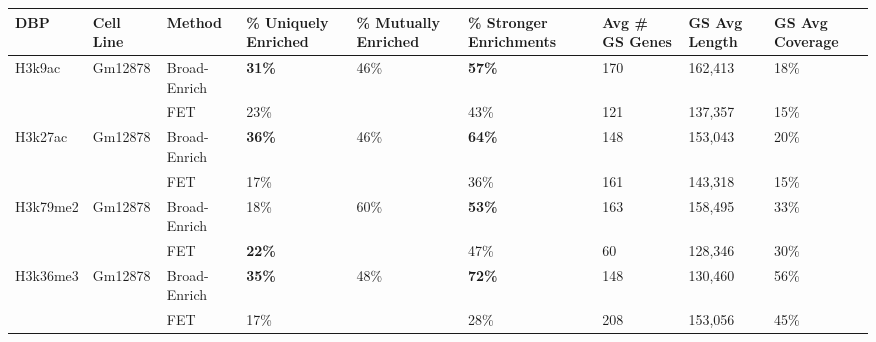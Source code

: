\newpage

\begin{sidewaystable}[!ht]
\tiny
\centering
\begin{tabular}{lll|p{1.5cm}p{1.5cm}p{1.5cm}p{1.5cm}p{1.5cm}p{1.5cm}}
\textbf{DBP} & \textbf{Cell Line} & \textbf{Method} & \textbf{\% Uniquely Enriched} & \textbf{\% Mutually Enriched} & \textbf{\% Stronger Enrichments} & \textbf{Avg \# GS Genes} & \textbf{GS Avg Length} & \textbf{GS Avg Coverage} \\\hline
H3k9ac       & Gm12878            & Broad-Enrich    & \textbf{31\%}                 & 46\%                          & \textbf{57\%}                    & 170                      & 162,413                & 18\%                     \\
             &                    & FET             & 23\%                          &                               & 43\%                             & 121                      & 137,357                & 15\%                     \\
H3k27ac      & Gm12878            & Broad-Enrich    & \textbf{36\%}                 & 46\%                          & \textbf{64\%}                    & 148                      & 153,043                & 20\%                     \\
             &                    & FET             & 17\%                          &                               & 36\%                             & 161                      & 143,318                & 15\%                     \\
H3k79me2     & Gm12878            & Broad-Enrich    & 18\%                          & 60\%                          & \textbf{53\%}                    & 163                      & 158,495                & 33\%                     \\
             &                    & FET             & \textbf{22\%}                 &                               & 47\%                             & 60                       & 128,346                & 30\%                     \\
H3k36me3     & Gm12878            & Broad-Enrich    & \textbf{35\%}                 & 48\%                          & \textbf{72\%}                    & 148                      & 130,460                & 56\%                     \\
             &                    & FET             & 17\%                          &                               & 28\%                             & 208                      & 153,056                & 45\%                     \\

\end{tabular}
\end{sidewaystable}
